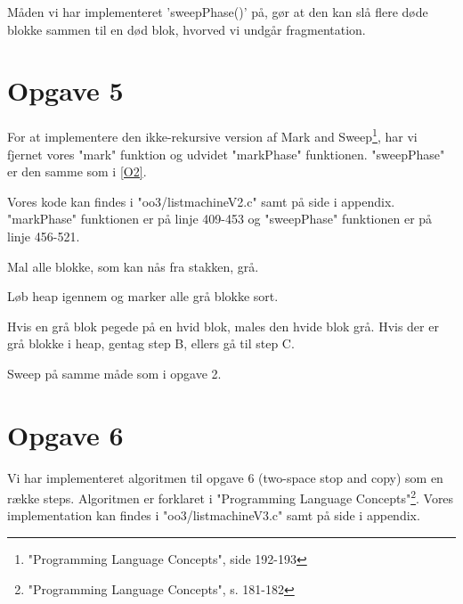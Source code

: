 Måden vi har implementeret 'sweepPhase()' på, gør at den kan slå flere døde blokke sammen til en død blok, hvorved vi undgår fragmentation.








\section{Opgave 5}
\label{O5}
For at implementere den ikke-rekursive version af Mark and Sweep\footnote{"Programming Language Concepts", side 192-193}, har vi fjernet vores "mark" funktion og udvidet "markPhase" funktionen. "sweepPhase" er den samme som i \ref{O2}.

Vores kode kan findes i "oo3/listmachineV2.c" samt på side \pageref{Code_V2} i appendix. "markPhase" funktionen er på linje 409-453 og "sweepPhase" funktionen er på linje 456-521.

\begin{my_description}
\item[Step A] Mal alle blokke, som kan nås fra stakken, grå.
\item[Step B] Løb heap igennem og marker alle grå blokke sort. 
	\begin{my_description}
	\item[Step B.1] Hvis en grå blok pegede på en hvid blok, males den hvide blok grå. Hvis der er grå blokke i heap, gentag step B, ellers gå til step C.
	\end{my_description}
\item[Step C] Sweep på samme måde som i opgave 2.
\end{my_description}



\section{Opgave 6}
\label{O6}
Vi har implementeret algoritmen til opgave 6 (two-space stop and copy) som en række steps. Algoritmen er forklaret i "Programming Language Concepts"\footnote{"Programming Language Concepts", s. 181-182}. Vores implementation kan findes i "oo3/listmachineV3.c" samt på side \pageref{Code_V3} i appendix.

